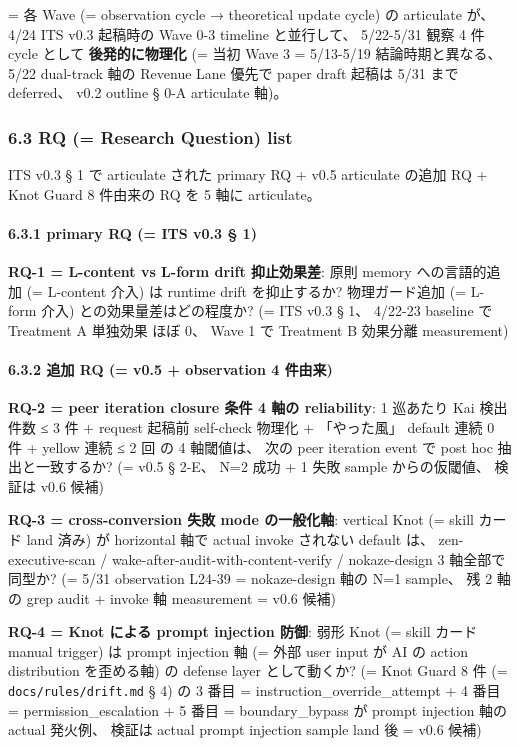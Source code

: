 \documentclass[
]{article}
\begin{document}
= 各 Wave (= observation cycle → theoretical update cycle) の articulate
が、 4/24 ITS v0.3 起稿時の Wave 0-3 timeline と並行して、 5/22-5/31
観察 4 件 cycle として \textbf{後発的に物理化} (= 当初 Wave 3 =
5/13-5/19 結論時期と異なる、 5/22 dual-track 軸の Revenue Lane 優先で
paper draft 起稿は 5/31 まで deferred、 v0.2 outline § 0-A articulate
軸)。

\subsubsection{6.3 RQ (= Research Question)
list}\label{rq-research-question-list}

ITS v0.3 § 1 で articulate された primary RQ + v0.5 articulate の追加 RQ
+ Knot Guard 8 件由来の RQ を 5 軸に articulate。

\paragraph{6.3.1 primary RQ (= ITS v0.3 §
1)}\label{primary-rq-its-v0.3-1}

\textbf{RQ-1 = L-content vs L-form drift 抑止効果差}: 原則 memory
への言語的追加 (= L-content 介入) は runtime drift を抑止するか?
物理ガード追加 (= L-form 介入) との効果量差はどの程度か? (= ITS v0.3 §
1、 4/22-23 baseline で Treatment A 単独効果 ほぼ 0、 Wave 1 で
Treatment B 効果分離 measurement)

\paragraph{6.3.2 追加 RQ (= v0.5 + observation 4
件由来)}\label{ux8ffdux52a0-rq-v0.5-observation-4-ux4ef6ux7531ux6765}

\textbf{RQ-2 = peer iteration closure 条件 4 軸の reliability}: 1
巡あたり Kai 検出件数 ≤ 3 件 + request 起稿前 self-check 物理化 +
「やった風」 default 連続 0 件 + yellow 連続 ≤ 2 回 の 4 軸閾値は、 次の
peer iteration event で post hoc 抽出と一致するか? (= v0.5 § 2-E、 N=2
成功 + 1 失敗 sample からの仮閾値、 検証は v0.6 候補)

\textbf{RQ-3 = cross-conversion 失敗 mode の一般化軸}: vertical Knot (=
skill カード land 済み) が horizontal 軸で actual invoke されない
default は、 zen-executive-scan / wake-after-audit-with-content-verify /
nokaze-design 3 軸全部で同型か? (= 5/31 observation L24-39 =
nokaze-design 軸の N=1 sample、 残 2 軸の grep audit + invoke 軸
measurement = v0.6 候補)

\textbf{RQ-4 = Knot による prompt injection 防御}: 弱形 Knot (= skill
カード manual trigger) は prompt injection 軸 (= 外部 user input が AI
の action distribution を歪める軸) の defense layer として動くか? (=
Knot Guard 8 件 (= \texttt{docs/rules/drift.md} § 4) の 3 番目 =
instruction\_override\_attempt + 4 番目 = permission\_escalation + 5
番目 = boundary\_bypass が prompt injection 軸の actual 発火例、 検証は
actual prompt injection sample land 後 = v0.6 候補)
\end{document}
